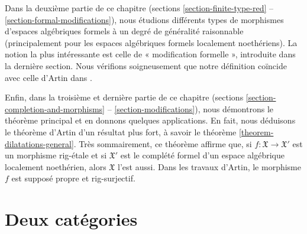 \medskip\noindent
Dans la deuxième partie de ce chapitre (sections
\ref{section-finite-type-red} -- \ref{section-formal-modifications}), nous
étudions différents types de morphismes d'espaces algébriques formels à un
degré de généralité raisonnable (principalement pour les espaces algébriques
formels localement noethériens). La notion la plus intéressante est celle de
« modification formelle », introduite dans la dernière section. Nous vérifions
soigneusement que notre définition coïncide avec celle d'Artin dans
\cite{ArtinII}.

\medskip\noindent
Enfin, dans la troisième et dernière partie de ce chapitre (sections
\ref{section-completion-and-morphisms} -- \ref{section-modifications}), nous
démontrons le théorème principal et en donnons quelques applications. En fait,
nous déduisons le théorème d'Artin d'un résultat plus fort, à savoir le théorème
\ref{theorem-dilatations-general}. Très sommairement, ce théorème affirme que,
si $f : \mathfrak X \to \mathfrak X'$ est un morphisme rig-étale et si
$\mathfrak X'$ est le complété formel d'un espace algébrique localement
noethérien, alors $\mathfrak X$ l'est aussi. Dans les travaux d'Artin, le
morphisme $f$ est supposé propre et rig-surjectif.









\section{Deux catégories}
\label{section-two-categories}

